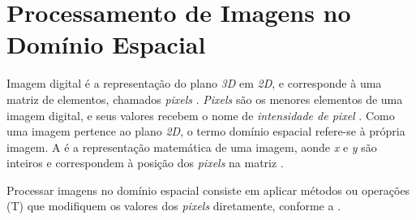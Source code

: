 
%


\section{Processamento de Imagens no Domínio Espacial}

\par Imagem digital é a representação do plano \textit{3D} em \textit{2D}, e corresponde à uma matriz de elementos, chamados \textit{pixels} \cite{gonsalez2006}. \textit{Pixels} são os menores elementos de uma imagem digital, e seus valores recebem o nome de \textit{intensidade de pixel} \cite{gonsalez2006}. Como uma imagem pertence ao plano \textit{2D}, o termo domínio espacial refere-se à própria imagem. A  é a representação matemática de uma imagem, aonde \textit{x} e \textit{y} são inteiros e correspondem à posição dos \textit{pixels} na matriz \cite{gonsalez2006}.


\par Processar imagens no domínio espacial consiste em aplicar métodos ou operações (T) que modifiquem os valores dos \textit{pixels} diretamente, conforme a  \cite{gonsalez2006}.

